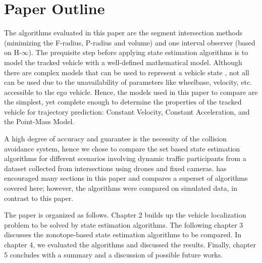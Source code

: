 \section{Paper Outline}
The algorithms evaluated in this paper are the segment intersection methods (minimizing the F-radius, P-radius and volume) and one interval observer (based on H-$\infty$). The prequisite step before applying state estimation algorithms is to model the tracked vehicle with a well-defined mathematical model. Although there are complex models that can be used to represent a vehicle state \cite{Althoff}, not all can be used due to the unavailability of parameters like wheelbase, velocity, etc. accessible to the ego vehicle. Hence, the models used in this paper to compare are the simplest, yet complete enough to determine the properties of the tracked vehicle for trajectory prediction: Constant Velocity, Constant Acceleration, and the Point-Mass Model.

A high degree of accuracy and guarantee is the necessity of the collision avoidance system, hence we chose to compare the set based state estimation algorithms for different scenarios involving dynamic traffic participants from a dataset collected from intersections using drones and fixed cameras. \cite{Rath} has encouraged many sections in this paper and compares a superset of algorithms covered here; however, the algorithms were compared on simulated data, in contrast to this paper.

The paper is organized as follows. Chapter 2 builds up the vehicle localization problem to be solved by state estimation algorithms. The following chapter 3 discusses the zonotope-based state estimation algorithms to be compared. In chapter 4, we evaluated the algorithms and discussed the results. Finally, chapter 5 concludes with a summary and a discussion of possible future works.




